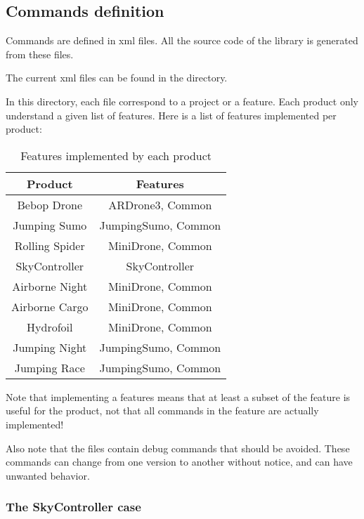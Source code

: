 \subsection{Commands definition}

Commands are defined in xml files. All the source code of the  library is generated from these files.

The current xml files can be found in the \href{https://github.com/Parrot-Developers/libARCommands/tree/master/Xml}{} directory.

In this directory, each  file correspond to a project or a feature. Each product only understand a given list of features. Here is a list of features implemented per product:

\begin{table}[h]
\centering
\begin{tabular}{|c|c|}
  \hline
  Product & Features \\
  \hline
  \hline
  Bebop Drone & ARDrone3, Common \\
  \hline
  Jumping Sumo & JumpingSumo, Common \\
  \hline
  Rolling Spider & MiniDrone, Common \\
  \hline
  SkyController & SkyController \\
  \hline
  Airborne Night & MiniDrone, Common \\
  \hline
  Airborne Cargo & MiniDrone, Common \\
  \hline
  Hydrofoil & MiniDrone, Common \\
  \hline
  Jumping Night & JumpingSumo, Common \\
  \hline
  Jumping Race & JumpingSumo, Common \\
  \hline
\end{tabular}
\caption{Features implemented by each product}
\end{table}

Note that implementing a features means that at least a subset of the feature is useful for the product, not that all commands in the feature are actually implemented!

Also note that the  files contain debug commands that should be avoided. These commands can change from one version to another without notice, and can have unwanted behavior.

\subsubsection{The SkyController case}


